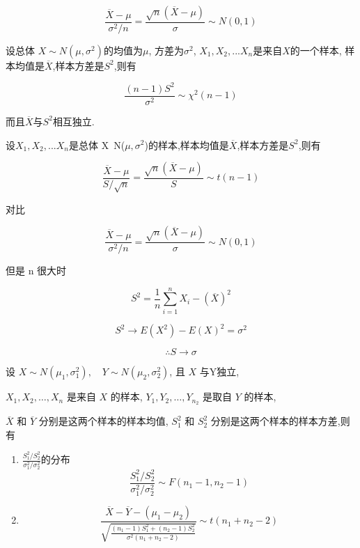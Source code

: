 \begin{corollary}
    $$
        \frac{\overline{X}-\mu}{\sigma^2/n} = \frac{\sqrt{n}(\overline{X}-\mu)}{\sigma} \sim N(0,1)
    $$
\end{corollary}

\begin{theorem}[样本方差的分布]
    设总体 $X\sim N(\mu,\sigma^2)$的均值为$\mu$, 方差为$σ^2$, $X_1,X_2,...X_n$是来自$X$的一个样本, 样本均值是$\overline{X}$,样本方差是$S^2$,则有

    $$
        { \frac{(n-1)S^2}{\sigma^2} \sim \chi^2(n-1)}
    $$

    而且$\overline{X}$与$S^2$相互独立.
\end{theorem}

\begin{theorem}[样本均值和样本方差的关系]
    设$X_1,X_2,...X_n$是总体 X~N($\mu,\sigma^2$)的样本,样本均值是$\overline{X}$,样本方差是$S^2$,则有

    $$
        {\frac{\overline{X}-\mu}{S / \sqrt{n}} = \frac{\sqrt{n}(\overline{X} - \mu)}{{ S}} \sim t(n-1)}
    $$

    对比

    $$
        \frac{\overline{X}-\mu}{\sigma^2/n} = \frac{\sqrt{n}(\overline{X}-\mu)}{{ \sigma}} \sim N(0,1)
    $$

    但是 n 很大时

    $$
        S^2 = \frac{1}{n} \sum_{i=1}^n X_i - (\overline{X})^2
    $$

    $$
        S^2 \to E(X^2) - E(X)^2= \sigma^2
    $$

    $$
        \therefore S \to \sigma
    $$
\end{theorem}

\begin{theorem}
    设 $ X \sim N\left(\mu_{1}, \sigma_{1}^{2}\right), \quad Y \sim N\left(\mu_{2}, \sigma_{2}^{2}\right) $, 且 $ X $ 与Y独立,

    $ X_{1}, X_{2}, \ldots, X_{n} $ 是来自 $ X $ 的样本, $ Y_{1}, Y_{2}, \ldots, Y_{n_{2}} $ 是取自 $ Y $ 的样本,

    $ \overline{{X}} $ 和 $ \overline{{Y}} $ 分别是这两个样本的样本均值, $ {S}_{1}^{2} $ 和 $ {S}_{2}^{2} $ 分别是这两个样本的样本方差,则有

    \begin{enumerate}
        \item $\frac{S_1^2/S^2_2}{\sigma_1^2 / \sigma_2^2}$的分布
              $$
                  {
                          \frac{S_1^2/S^2_2}{\sigma_1^2 / \sigma_2^2} \sim F(n_1 - 1, n_2 -1)}
              $$
        \item $$
                  \frac{\overline{X} - \overline{Y}- (\mu_1 - \mu_2 )}{\sqrt{ \frac{(n_1 - 1) S_1^2 + (n_2 - 1 ) S_2^2 }{\sigma^2 (n_1+n_2-2)} }} \sim t(n_1+n_2-2)
              $$
    \end{enumerate}

\end{theorem}

